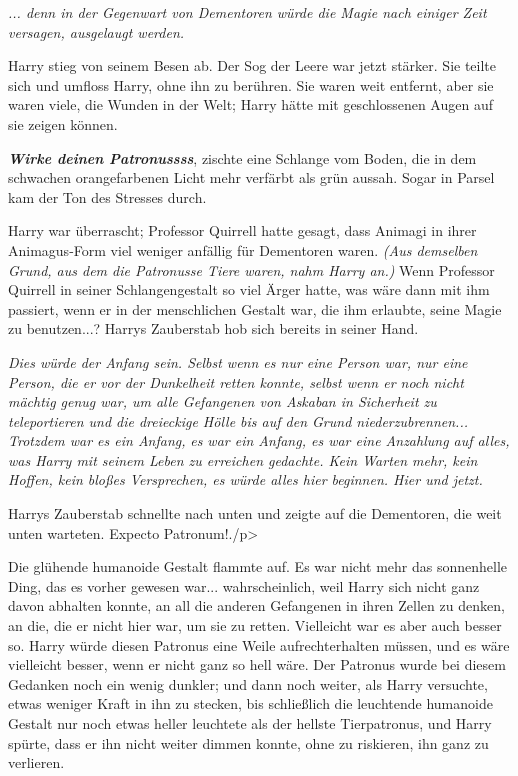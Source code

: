 \emph{... denn in der Gegenwart von Dementoren würde die Magie nach einiger
Zeit versagen, ausgelaugt werden.}

Harry stieg von seinem Besen ab. Der Sog der Leere war jetzt stärker. Sie teilte
sich und umfloss Harry, ohne ihn zu berühren. Sie waren weit entfernt, aber sie
waren viele, die Wunden in der Welt; Harry hätte mit geschlossenen Augen auf sie
zeigen können.

\glqq{}\textbf{\emph{Wirke deinen Patronussss}}\grqq{}, zischte eine Schlange vom
Boden, die in dem schwachen orangefarbenen Licht mehr verfärbt als grün aussah.
Sogar in Parsel kam der Ton des Stresses durch.

Harry war überrascht; Professor Quirrell hatte gesagt, dass Animagi in ihrer
Animagus-Form viel weniger anfällig für Dementoren waren.\emph{ (Aus demselben
Grund, aus dem die Patronusse Tiere waren, nahm Harry an.)} Wenn Professor
Quirrell in seiner Schlangengestalt so viel Ärger hatte, was wäre dann mit ihm
passiert, wenn er in der menschlichen Gestalt war, die ihm erlaubte, seine Magie
zu benutzen...? Harrys Zauberstab hob sich bereits in seiner Hand.

\emph{Dies würde der Anfang sein. Selbst wenn es nur eine Person war, nur eine
Person, die er vor der Dunkelheit retten konnte, selbst wenn er noch nicht
mächtig genug war, um alle Gefangenen von Askaban in Sicherheit zu teleportieren
und die dreieckige Hölle bis auf den Grund niederzubrennen... Trotzdem war es
ein Anfang,} \emph{es war ein Anfang, es war eine Anzahlung auf alles, was Harry
mit seinem Leben zu erreichen gedachte. Kein Warten mehr, kein Hoffen, kein
bloßes Versprechen, es würde alles hier beginnen. Hier und jetzt.}

Harrys Zauberstab schnellte nach unten und zeigte auf die Dementoren, die weit
unten warteten. \glqq{}Expecto
Patronum!\grqq{}./p>

Die glühende humanoide Gestalt flammte auf. Es war nicht mehr das sonnenhelle
Ding, das es vorher gewesen war... wahrscheinlich, weil Harry sich nicht ganz
davon abhalten konnte, an all die anderen Gefangenen in ihren Zellen zu denken,
an die, die er nicht hier war, um sie zu retten. Vielleicht war es aber auch
besser so. Harry würde diesen Patronus eine Weile aufrechterhalten müssen, und
es wäre vielleicht besser, wenn er nicht ganz so hell wäre. Der Patronus wurde
bei diesem Gedanken noch ein wenig dunkler; und dann noch weiter, als Harry
versuchte, etwas weniger Kraft in ihn zu stecken, bis schließlich die leuchtende
humanoide Gestalt nur noch etwas heller leuchtete als der hellste Tierpatronus,
und Harry spürte, dass er ihn nicht weiter dimmen konnte, ohne zu riskieren, ihn
ganz zu verlieren.

